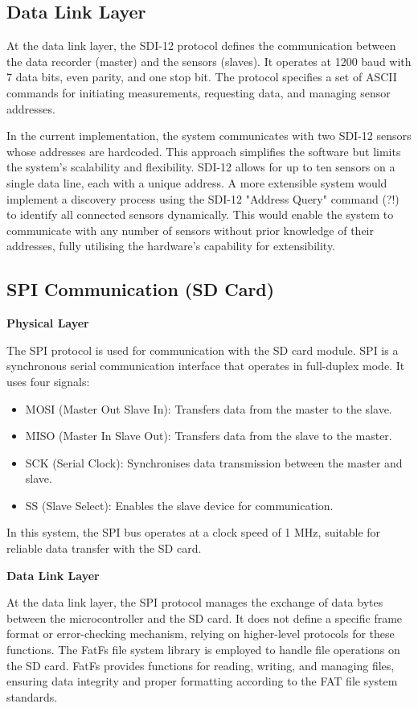 \subsection{Data Link Layer}

At the data link layer, the SDI-12 protocol defines the communication between the data recorder (master) and the sensors (slaves). It operates at 1200 baud with 7 data bits, even parity, and one stop bit. The protocol specifies a set of ASCII commands for initiating measurements, requesting data, and managing sensor addresses.

In the current implementation, the system communicates with two SDI-12 sensors whose addresses are hardcoded. This approach simplifies the software but limits the system's scalability and flexibility. SDI-12 allows for up to ten sensors on a single data line, each with a unique address. A more extensible system would implement a discovery process using the SDI-12 "Address Query" command (?!) to identify all connected sensors dynamically. This would enable the system to communicate with any number of sensors without prior knowledge of their addresses, fully utilising the hardware's capability for extensibility.

\subsection{SPI Communication (SD Card)}
\textbf{Physical Layer}

The SPI protocol is used for communication with the SD card module. SPI is a synchronous serial communication interface that operates in full-duplex mode. It uses four signals:
\begin{itemize}
    \item MOSI (Master Out Slave In): Transfers data from the master to the slave.
    \item MISO (Master In Slave Out): Transfers data from the slave to the master.
    \item SCK (Serial Clock): Synchronises data transmission between the master and slave.
    \item SS (Slave Select): Enables the slave device for communication.
\end{itemize}
In this system, the SPI bus operates at a clock speed of 1 MHz, suitable for reliable data transfer with the SD card.

\textbf{Data Link Layer}

At the data link layer, the SPI protocol manages the exchange of data bytes between the microcontroller and the SD card. It does not define a specific frame format or error-checking mechanism, relying on higher-level protocols for these functions. The FatFs file system library is employed to handle file operations on the SD card. FatFs provides functions for reading, writing, and managing files, ensuring data integrity and proper formatting according to the FAT file system standards.

